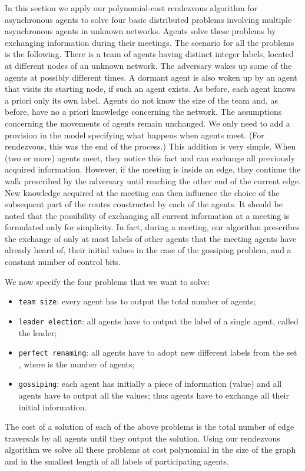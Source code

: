 \documentclass [11pt] {article}
\begin{document}
In this section we apply our polynomial-cost rendezvous algorithm for asynchronous agents to solve four basic distributed problems
involving multiple asynchronous agents in unknown networks. Agents solve these problems by exchanging information during their meetings.
The scenario for all the problems is the following. There is a team of  agents having distinct integer labels, located at different nodes of an unknown network. 
The adversary wakes up some of the agents at possibly different times. A dormant agent is also woken up by an agent that visits its starting node, if such an agent exists.
As before, each agent knows a priori only its own label. Agents do not know the size of the team and, as before, have no
a priori knowledge concerning the network.
The assumptions concerning the movements of agents remain unchanged. We only need to add a provision in the model specifying what happens when agents meet. (For rendezvous, this was the end of the process.) This addition is very simple. 
When (two or more)  agents meet, they notice this fact and can exchange all previously acquired information. 
However, if the meeting is inside an edge,
they continue the walk prescribed by the adversary until reaching the other end of the current edge. New knowledge acquired at the meeting
can then influence the choice of the subsequent part of the routes constructed by each of the agents. It should be noted that the possibility
of exchanging all current information at a meeting is formulated only for simplicity. In fact, during a meeting, our algorithm prescribes the exchange of only at most
 labels of other agents that the meeting agents have already heard of, their initial values in the case of the gossiping problem, and a constant number of control bits.

We now specify the four problems that we want to solve:
\begin{itemize}
\item
{\tt team size}: every agent has to output the total
number  of agents; 
\item{\tt leader election}: all agents have to output the label of a single agent, called the leader;
\item
{\tt perfect renaming}: all agents
have to adopt new different labels from the set , where  is the number of agents;  
\item
{\tt gossiping}:  each agent has initially a piece of information (value) and all agents have to output all the values; thus agents have to exchange
all their initial information.
\end{itemize} 
The cost of a solution of each of the above problems is the total number of edge traversals by all agents until they output the solution.
Using our rendezvous algorithm we solve all these problems at cost polynomial in the size of the graph and in the smallest length of all labels of participating agents. 
\end{document}
